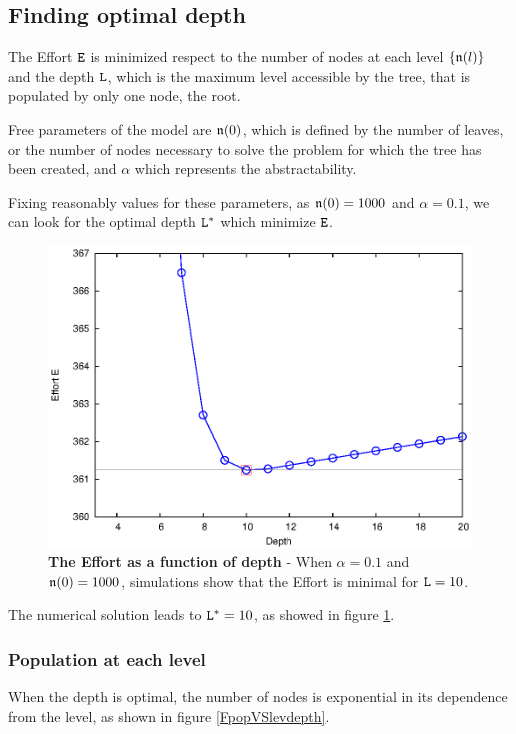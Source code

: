 \subsection{Finding optimal depth}
The Effort $\mathtt E$ is minimized respect to the number of nodes at each level $\{ \mathfrak n(\mathnormal l) \}$ and the depth $\mathtt L$, which is the maximum level accessible by the tree, that is populated by only one node, the root.

Free parameters of the model are $\mathfrak n(0)$, which is defined by the number of leaves, or the number of nodes necessary to solve the problem for which the tree has been created, and $\alpha$ which represents the abstractability.

Fixing reasonably values for these parameters, as $\mathfrak n(0)=1000$ and $\alpha=0.1$, we can look for the optimal depth $\mathtt L^*$ which minimize $\mathtt E$.
%
\begin{figure}[ht]%
\includegraphics[width=\textwidth,draft=false]{grafici/effVSdepth.1000.1.eps}
\caption{\label{FeffVSdepth} \footnotesize\textbf{The Effort as a function of depth} - When $\alpha=0.1$ and $\mathfrak n(0)=1000$, simulations show that the Effort is minimal for $\mathtt L=10$.}
\end{figure}

The numerical solution leads to $\mathtt L^*=10$, as showed in figure \ref{FeffVSdepth}.

\subsubsection{Population at each level}
When the depth is optimal, the number of nodes is exponential in its dependence from the level, as shown in figure \ref{FpopVSlevdepth}.

